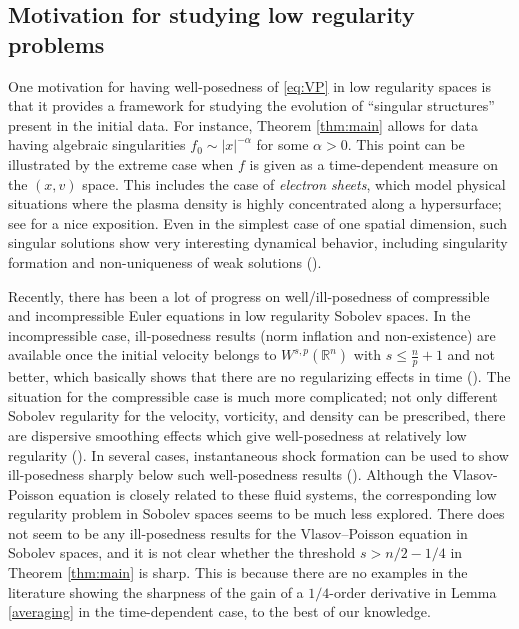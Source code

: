\documentclass[11pt]{amsart}
\theoremstyle{definition}
\theoremstyle{remark}
\numberwithin{equation}{section}
\newcommand{\0}{\emptyset}
\newcommand{\alp}{\alpha}
\newcommand{\bbR}{\mathbb R}
\begin{document}
	
	
	\subsection{Motivation for studying low regularity problems}
	One motivation for having well-posedness of \eqref{eq:VP} in low regularity spaces is that it provides a framework for studying the evolution of ``singular structures'' present in the initial data. For instance, Theorem \ref{thm:main} allows for data having algebraic singularities $f_{0} \sim |x|^{-\alp}$ for some $\alp>0$. This point can be illustrated by the extreme case when $f$ is given as a time-dependent measure on the $(x,v)$ space. This includes the case of \textit{electron sheets}, which model physical situations where the plasma density is highly concentrated along a hypersurface; see \cite[Chap. 13]{MB} for a nice exposition. Even in the simplest case of one spatial dimension, such singular solutions show very interesting dynamical behavior, including singularity formation and non-uniqueness of weak solutions (\cite{Dz,Wei,Ro,MB}).  
	
	
	
	Recently, there has been a lot of progress on well/ill-posedness of compressible and incompressible Euler equations in low regularity Sobolev spaces. In the incompressible case, ill-posedness results (norm inflation and non-existence) are available once the initial velocity belongs to $W^{s,p}(\bbR^n)$ with
	$s \le \frac{n}{p} + 1$ and not better, which basically shows that there are no regularizing effects in time (\cite{BL1,CMZO,EJ17,KJ24,Luo,JMZO}). The situation for the compressible case is much more complicated; not only  different Sobolev regularity for the velocity, vorticity, and density can be prescribed, there are dispersive smoothing effects which give well-posedness at relatively low regularity (\cite{AZ,ACY2,SmTa,DLMS,Wang1,Zhang2,Zhang3}). In several cases, instantaneous shock formation can be used to show ill-posedness sharply below such well-posedness results (\cite{Lind1,LuSp,ACY}).    Although the Vlasov-Poisson equation is closely related to these fluid systems, the corresponding low regularity problem in Sobolev spaces seems to be much less explored. There does not seem to be any ill-posedness results for the Vlasov--Poisson equation in Sobolev spaces, and it is not clear whether the threshold $s> n/2 - 1/4$ in Theorem \ref{thm:main} is sharp. This is because there are no examples in the literature showing the sharpness of the gain of a $1/4$-order derivative in Lemma \ref{averaging} in the time-dependent case, to the best of our knowledge.  
	
\end{document}
